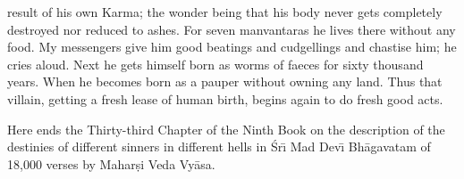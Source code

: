 result of his own Karma; the wonder being that his body never gets completely destroyed nor reduced to ashes. For seven manvantaras he lives there without any food. My messengers give him good beatings and cudgellings and chastise him; he cries aloud. Next he gets himself born as worms of faeces for sixty thousand years. When he becomes born as a pauper without owning any land. Thus that villain, getting a fresh lease of human birth, begins again to do fresh good acts.

Here ends the Thirty-third Chapter of the Ninth Book on the description of the destinies of different sinners in different hells in \'Sr\={\i} Mad Dev\={\i} Bh\=agavatam of 18,000 verses by Mahar\d{s}i Veda Vy\=asa.



